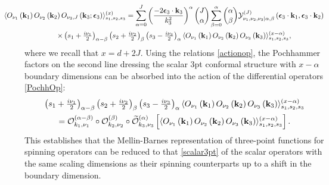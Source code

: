 \documentclass[11pt,a4paper]{article}
\begin{document}
\begin{multline}\label{00Jpoly}
  \hspace*{-1cm} \langle O_{\nu_1}\left({\bf k}_1\right)O_{\nu_2}\left({\bf k}_2\right)O_{\nu_3,J}\left({\bf k}_3;\boldsymbol{\epsilon}_3\right)  \rangle^{(x)}_{s_1,s_2,s_3}  = \sum^J_{\alpha=0}\left(\frac{-2 \boldsymbol{\epsilon}_3 \cdot {\bf k}_3}{k^2_3}\right)^\alpha\binom{J}{\alpha}\sum^{\alpha}_{\beta=0}\binom{\alpha}{\beta}  {\cal Y}^{\left(J\right)}_{\nu_1,\nu_2,\nu_3|\alpha,\beta}\left(\boldsymbol{\epsilon}_3 \cdot {\bf k}_1,\boldsymbol{\epsilon}_3 \cdot {\bf k}_2\right) \\ \times  \left(s_1+\tfrac{i\nu_1}{2}\right)_{\alpha-\beta}\left(s_2+\tfrac{i\nu_2}{2}\right)_{\beta}\left(s_3-\tfrac{i\nu_3}{2}\right)_{\alpha}\langle O_{\nu_1}\left({\bf k}_1\right)O_{\nu_2}\left({\bf k}_2\right)O_{\nu_3}\left({\bf k}_3\right)  \rangle^{\left(x-\alpha\right)}_{s_1,s_2,s_3},
\end{multline}
where we recall that $x=d+2J$. Using the relations \eqref{actionop}, the Pochhammer factors on the second line dressing the scalar 3pt conformal structure with $x-\alpha$ boundary dimensions can be absorbed into the action of the differential operators \eqref{PochhOp}:
\begin{multline}\label{diffop123}
    \left(s_1+\tfrac{i\nu_1}{2}\right)_{\alpha-\beta}\left(s_2+\tfrac{i\nu_2}{2}\right)_{\beta}\left(s_3-\tfrac{i\nu_3}{2}\right)_{\alpha}\langle O_{\nu_1}\left({\bf k}_1\right)O_{\nu_2}\left({\bf k}_2\right)O_{\nu_3}\left({\bf k}_3\right)  \rangle^{\left(x-\alpha\right)}_{s_1,s_2,s_3}\\
    = \mathcal{O}_{k_1,\nu_1}^{(\alpha-\beta)} \circ \mathcal{O}_{k_2,\nu_2}^{(\beta)} \circ \widetilde{\mathcal{O}}_{k_3,\nu_3}^{(\alpha)}\left[\langle O_{\nu_1}\left({\bf k}_1\right)O_{\nu_2}\left({\bf k}_2\right)O_{\nu_3}\left({\bf k}_3\right)  \rangle^{\left(x-\alpha\right)}_{s_1,s_2,s_3}\right].
\end{multline}
This establishes that the Mellin-Barnes representation of three-point functions for spinning operators can be reduced to that \eqref{scalar3pt} of the scalar operators with the same scaling dimensions as their spinning counterparts up to a shift in the boundary dimension. 
\end{document}
